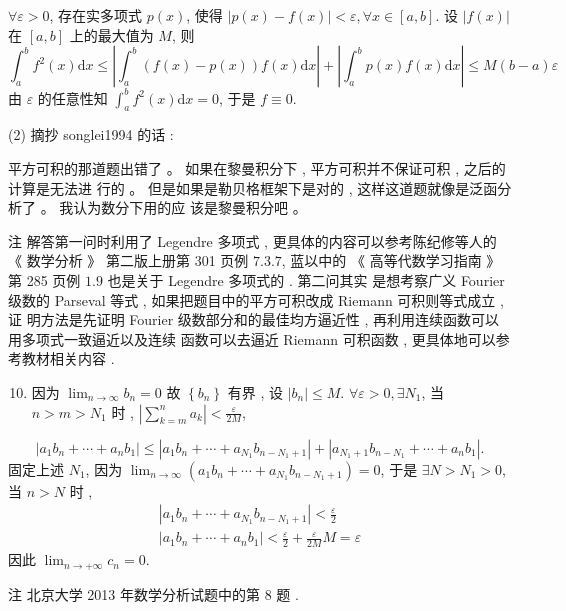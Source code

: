 \documentclass[10pt]{article}
\begin{document}
$\forall \varepsilon>0$,  存在实多项式  $p(x)$,  使得  $|p(x)-f(x)|<\varepsilon, \forall x \in[a, b]$.  设  $|f(x)|$  在  $[a, b]$  上的最大值为  $M$,  则 
$$
\int_{a}^{b} f^{2}(x) \mathrm{d} x \leqslant\left|\int_{a}^{b}(f(x)-p(x)) f(x) \mathrm{d} x\right|+\left|\int_{a}^{b} p(x) f(x) \mathrm{d} x\right| \leqslant M(b-a) \varepsilon
$$
 由  $\varepsilon$  的任意性知  $\int_{a}^{b} f^{2}(x) \mathrm{d} x=0$,  于是  $f \equiv 0$.

(2)  摘抄  songlei1994  的话 :

 平方可积的那道题出错了 。 如果在黎曼积分下 ,  平方可积并不保证可积 ,  之后的计算是无法进   行的 。 但是如果是勒贝格框架下是对的 ,  这样这道题就像是泛函分析了 。 我认为数分下用的应   该是黎曼积分吧 。

 注   解答第一问时利用了  Legendre  多项式 ,  更具体的内容可以参考陈纪修等人的 《 数学分析 》 第二版上册第  301  页例  $7.3 .7$,  蓝以中的 《 高等代数学习指南 》 第  285  页例  $1.9$  也是关于  Legendre  多项式的 .  第二问其实   是想考察广义  Fourier  级数的  Parseval  等式 ,  如果把题目中的平方可积改成  Riemann  可积则等式成立 ,  证   明方法是先证明  Fourier  级数部分和的最佳均方逼近性 ,  再利用连续函数可以用多项式一致逼近以及连续   函数可以去逼近  Riemann  可积函数 ,  更具体地可以参考教材相关内容 .

\begin{enumerate}
  \setcounter{enumi}{9}
  \item  因为  $\lim _{n \rightarrow \infty} b_{n}=0$  故  $\left\{b_{n}\right\}$  有界 ,  设  $\left|b_{n}\right| \leqslant M$. $\forall \varepsilon>0, \exists N_{1}$,  当  $n>m>N_{1}$  时 , $\left|\sum_{k=m}^{n} a_{k}\right|<\frac{\varepsilon}{2 M}$,
\end{enumerate}
$$
\left|a_{1} b_{n}+\cdots+a_{n} b_{1}\right| \leqslant\left|a_{1} b_{n}+\cdots+a_{N_{1}} b_{n-N_{1}+1}\right|+\left|a_{N_{1}+1} b_{n-N_{1}}+\cdots+a_{n} b_{1}\right| .
$$
 固定上述  $N_{1}$,  因为  $\lim _{n \rightarrow \infty}\left(a_{1} b_{n}+\cdots+a_{N_{1}} b_{n-N_{1}+1}\right)=0$,  于是  $\exists N>N_{1}>0$,  当  $n>N$  时 ,
$$
\begin{gathered}
\left|a_{1} b_{n}+\cdots+a_{N_{1}} b_{n-N_{1}+1}\right|<\frac{\varepsilon}{2} \\
\left|a_{1} b_{n}+\cdots+a_{n} b_{1}\right|<\frac{\varepsilon}{2}+\frac{\varepsilon}{2 M} M=\varepsilon
\end{gathered}
$$
 因此  $\lim _{n \rightarrow+\infty} c_{n}=0$.

 注   北京大学  2013  年数学分析试题中的第  8  题 .
\end{document}
